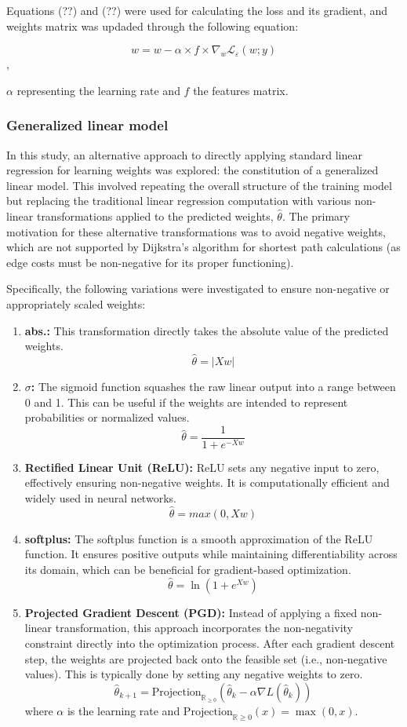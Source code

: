 Equations (??) and (??) were used for calculating the loss and its gradient, and weights matrix was updaded through the following equation:

\[
w = w - \alpha \times f \times \nabla_w \mathcal{L}_\varepsilon(w; y) \tag{12}
\],

$\alpha$ representing the learning rate and $f$ the features matrix.

\subsubsection{Generalized linear model}

In this study, an alternative approach to directly applying standard linear regression for learning weights was explored: the constitution of a generalized linear model. This involved repeating the overall structure of the training model but replacing the traditional linear regression computation with various non-linear transformations applied to the predicted weights, $\hat{\theta}$. The primary motivation for these alternative transformations was to avoid negative weights, which are not supported by Dijkstra's algorithm for shortest path calculations (as edge costs must be non-negative for its proper functioning).

Specifically, the following variations were investigated to ensure non-negative or appropriately scaled weights:

\begin{enumerate}
    \item \textbf{abs.:} This transformation directly takes the absolute value of the predicted weights.
    \[\hat{\theta} = |Xw| \tag{13}\]
    \item \textbf{$\sigma$:} The sigmoid function squashes the raw linear output into a range between 0 and 1. This can be useful if the weights are intended to represent probabilities or normalized values.
    \[\hat{\theta} = \frac{1}{1+e^{-Xw}} \tag{14}\]
    \item \textbf{Rectified Linear Unit (ReLU):} ReLU sets any negative input to zero, effectively ensuring non-negative weights. It is computationally efficient and widely used in neural networks.
    \[\hat{\theta} = max(0,Xw) \tag{15}\]
    \item \textbf{softplus:} The softplus function is a smooth approximation of the ReLU function. It ensures positive outputs while maintaining differentiability across its domain, which can be beneficial for gradient-based optimization.
    \[\hat{\theta} = \ln(1+e^{Xw}) \tag{16}\]
    \item \textbf{Projected Gradient Descent (PGD):} Instead of applying a fixed non-linear transformation, this approach incorporates the non-negativity constraint directly into the optimization process. After each gradient descent step, the weights are projected back onto the feasible set (i.e., non-negative values). This is typically done by setting any negative weights to zero. 
    \[ \hat{\theta}_{k+1} = \text{Projection}_{\mathbb{R}_{\ge 0}}(\hat{\theta}_k - \alpha \nabla L(\hat{\theta}_k)) \tag{17} \] 
    where $\alpha$ is the learning rate and $\text{Projection}_{\mathbb{R}{\ge 0}}(x) = \max(0, x)$. 
\end{enumerate}


